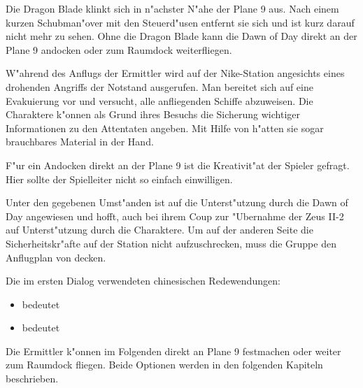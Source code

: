 Die Dragon Blade klinkt sich in n"achster N"ahe der Plane 9 aus. Nach einem kurzen Schubman"over mit den Steuerd"usen entfernt sie sich und ist kurz darauf nicht mehr zu sehen. Ohne die Dragon Blade kann die Dawn of Day direkt an der Plane 9 andocken oder zum Raumdock weiterfliegen.

\begin{remarks}
	W"ahrend des Anflugs der Ermittler wird auf der Nike-Station angesichts eines drohenden Angriffs der Notstand ausgerufen. Man bereitet sich auf eine Evakuierung vor und versucht, alle anfliegenden Schiffe abzuweisen. Die Charaktere k"onnen als Grund ihres Besuchs die Sicherung wichtiger Informationen zu den Attentaten angeben. Mit Hilfe von \ml{} h"atten sie sogar brauchbares Material in der Hand. 
	
	F"ur ein Andocken direkt an der Plane 9 ist die Kreativit"at der Spieler gefragt. Hier sollte der Spielleiter nicht so einfach einwilligen.

	Unter den gegebenen Umst"anden ist \xl{} auf die Unterst"utzung durch die Dawn of Day angewiesen und hofft, auch bei ihrem Coup zur "Ubernahme der Zeus II-2 auf Unterst"utzung durch die Charaktere. Um auf der anderen Seite die Sicherheitskr"afte auf der Station nicht aufzuschrecken, muss die Gruppe den Anflugplan von \xl{} decken.

	Die im ersten Dialog verwendeten chinesischen Redewendungen:
	
	\begin{itemize}
		\item {} bedeutet 
		\item {} bedeutet 
	\end{itemize}

	Die Ermittler k"onnen im Folgenden direkt an Plane 9 festmachen oder weiter zum Raumdock fliegen. Beide Optionen werden in den folgenden Kapiteln beschrieben.
\end{remarks}
